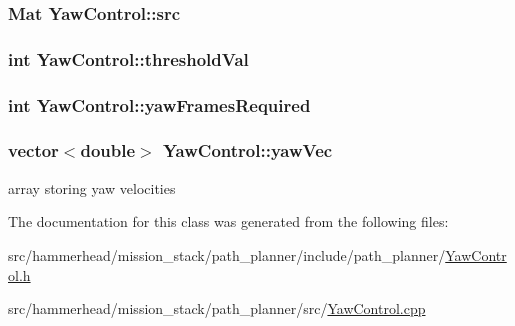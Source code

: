 \subsubsection[{\texorpdfstring{src}{src}}]{\setlength{\rightskip}{0pt plus 5cm}Mat Yaw\+Control\+::src}\hypertarget{classYawControl_a02a206520541343b1a0eab7c6129acc3}{}\label{classYawControl_a02a206520541343b1a0eab7c6129acc3}
\subsubsection[{\texorpdfstring{threshold\+Val}{thresholdVal}}]{\setlength{\rightskip}{0pt plus 5cm}int Yaw\+Control\+::threshold\+Val}\hypertarget{classYawControl_aac657b91e9b950cf4087cbe045fc10e3}{}\label{classYawControl_aac657b91e9b950cf4087cbe045fc10e3}
\subsubsection[{\texorpdfstring{yaw\+Frames\+Required}{yawFramesRequired}}]{\setlength{\rightskip}{0pt plus 5cm}int Yaw\+Control\+::yaw\+Frames\+Required}\hypertarget{classYawControl_a52fc55d1751f266d7cffb7001942a012}{}\label{classYawControl_a52fc55d1751f266d7cffb7001942a012}
\subsubsection[{\texorpdfstring{yaw\+Vec}{yawVec}}]{\setlength{\rightskip}{0pt plus 5cm}vector$<$double$>$ Yaw\+Control\+::yaw\+Vec}\hypertarget{classYawControl_a1bbb4b2ad414fc1e5a2edbde811bd7fe}{}\label{classYawControl_a1bbb4b2ad414fc1e5a2edbde811bd7fe}


array storing yaw velocities 



The documentation for this class was generated from the following files\+:\begin{DoxyCompactItemize}
\item 
src/hammerhead/mission\+\_\+stack/path\+\_\+planner/include/path\+\_\+planner/\hyperlink{YawControl_8h}{Yaw\+Control.\+h}\item 
src/hammerhead/mission\+\_\+stack/path\+\_\+planner/src/\hyperlink{YawControl_8cpp}{Yaw\+Control.\+cpp}\end{DoxyCompactItemize}
